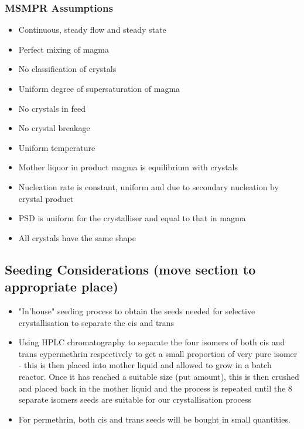 \subsubsection{MSMPR Assumptions}
\begin{itemize}
\item Continuous, steady flow and steady state
\item Perfect mixing of magma
\item No classification of crystals
\item Uniform degree of supersaturation of magma
\item No crystals in feed
\item No crystal breakage
\item Uniform temperature
\item Mother liquor in product magma is equilibrium with crystals
\item Nucleation rate is constant, uniform and due to secondary nucleation by crystal product
\item PSD is uniform for the crystalliser and equal to that in magma
\item All crystals have the same shape
\end{itemize}

\subsection{Seeding Considerations (move section to appropriate place)} 
\begin{itemize}
    \item "In'house" seeding process to obtain the seeds needed for selective crystallisation to separate the cis and trans
    \item Using HPLC chromatography to separate the four isomers of both cis and trans cypermethrin respectively to get a small proportion of very pure isomer - this is then placed into mother liquid and allowed to grow in a batch reactor. Once it has reached a suitable size (put amount), this is then crushed and placed back in the mother liquid and the process is repeated until the 8 separate isomers seeds are suitable for our crystallisation process
    \item For permethrin, both cis and trans seeds will be bought in small quantities. 
\end{itemize}